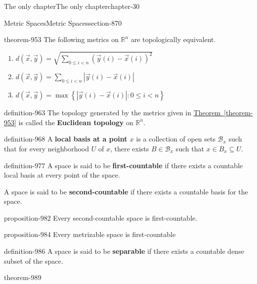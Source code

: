 \documentclass[oneside,10pt,]{book}
\newcommand{\terminology}[1]{\textbf{#1}}
\newcommand{\mb}{\mathbb}
\newcommand{\mc}{\mathcal}
\newcommand{\setBuilder}[2]{\left\{#1:#2\right\}}
\newcommand{\lt}{<}
\begin{document}
\begin{chapterptx}{The only chapter}{}{The only chapter}{}{}{chapter-30}
\begin{sectionptx}{Metric Spaces}{}{Metric Spaces}{}{}{section-870}
\begin{theorem}{}{}{theorem-953}%
\hypertarget{p-954}{}%
The following metrics on \(\mb R^n\) are topologically equivalent.%
\leavevmode%
\begin{enumerate}
\item\hypertarget{li-957}{}\(d(\vec x,\vec y)=\sqrt{\sum_{0\leq i\lt n}(\vec y(i)-\vec x(i))^2}\)%
\item\hypertarget{li-959}{}\(d(\vec x,\vec y)=\sum_{0\leq i\lt n}|\vec y(i)-\vec x(i)|\)%
\item\hypertarget{li-961}{}\(d(\vec x,\vec y)=\max\setBuilder{|\vec y(i)-\vec x(i)|}{0\leq i\lt n}\)%
\end{enumerate}
\end{theorem}
\begin{definition}{}{definition-963}%
\hypertarget{p-964}{}%
The topology generated by the metrics given in \hyperref[theorem-953]{Theorem~\ref{theorem-953}} is called the \terminology{Euclidean topology} on \(\mb R^n\).%
\end{definition}
\begin{definition}{}{definition-968}%
\hypertarget{p-969}{}%
A \terminology{local basis at a point \(x\)} is a collection of open sets \(\mc B_x\) such that for every neighborhood \(U\) of \(x\), there exists \(B\in\mc B_x\) such that \(x\in B_x\subseteq U\).%
\end{definition}
\begin{definition}{}{definition-977}%
\hypertarget{p-978}{}%
A space is said to be \terminology{first-countable} if there exists a countable local basis at every point of the space.%
\par
\hypertarget{p-980}{}%
A space is said to be \terminology{second-countable} if there exists  a countable basis for the space.%
\end{definition}
\begin{proposition}{}{}{proposition-982}%
\hypertarget{p-983}{}%
Every second-countable space is first-countable.%
\end{proposition}
\begin{proposition}{}{}{proposition-984}%
\hypertarget{p-985}{}%
Every metrizable space is first-countable%
\end{proposition}
\begin{definition}{}{definition-986}%
\hypertarget{p-987}{}%
A space is said to be \terminology{separable} if there exists a countable dense subset of the space.%
\end{definition}
\begin{theorem}{}{}{theorem-989}%

\end{theorem}
\end{sectionptx}
\end{chapterptx}
\end{document}
